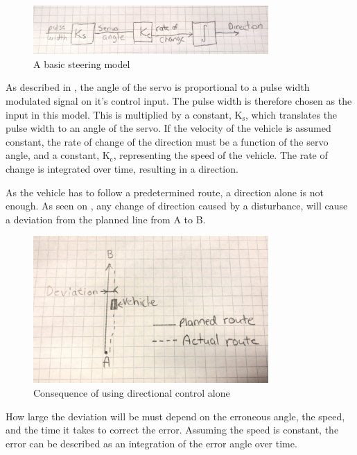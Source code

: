 \begin{figure}[H]
	\centering
	\includegraphics[width=0.8\textwidth]{figures/basic_steering_model.jpg}
	\caption{A basic steering model}
	\label{basicSteering}
\end{figure}
 
As described in , the angle of the servo is proportional to a pulse width modulated signal on it's control input. The pulse width is therefore chosen as the input in this model. This is multiplied by a constant, $\text{K}_\text{s}$, which translates the pulse width to an angle of the servo.
If the velocity of the vehicle is assumed constant, the rate of change of the direction must be a function of the servo angle, and a constant, $\text{K}_\text{c}$, representing the speed of the vehicle.
The rate of change is integrated over time, resulting in a direction. 

As the vehicle has to follow a predetermined route, a direction alone is not enough. As seen on , any change of direction caused by a disturbance, will cause a deviation from the planned line from A to B.

\begin{figure}[H]
	\centering
	\includegraphics[width=0.8\textwidth]{figures/steering_deviation.jpg}
	\caption{Consequence of using directional control alone}
	\label{SteeringDeviation}
\end{figure}

How large the deviation will be must depend on the erroneous angle, the speed, and the time it takes to correct the error. Assuming the speed is constant, the error can be described as an integration of the error angle over time.


